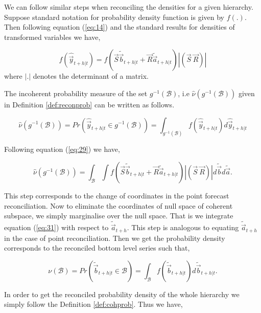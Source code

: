 \documentclass[graybox]{svmult}
\begin{document}
We can follow similar steps when reconciling the densities for a given hierarchy. 
Suppose standard notation for probability density function is given by $f(.)$.  Then following equation (\ref{eq:14}) and the standard results for densities of transformed variables we have, 

\begin{equation}\label{eq:29}
f(\hat{\vec{y}}_{t+h|t})=f(\vec{S}\tilde{\vec{b}}_{t+h|t}+\vec{R}\tilde{\vec{a}}_{t+h|t})|(\vec{S}~\vec{R})|
\end{equation}
where $|.|$ denotes the determinant of a matrix.  

The incoherent probability measure of the set $g^{-1}(\mathcal{B})$, i.e $\hat{\nu}(g^{-1}(\mathcal{B}))$ given in Definition \ref{def:reconprob} can be written as follows.

\begin{equation}\label{eq:30}
\hat{\nu}(g^{-1}(\mathcal{B})) = Pr(\hat{\vec{y}}_{t+h|t} \in g^{-1}(\mathcal{B}))
= \int_{g^{-1}(\mathcal{B})}f(\hat{\vec{y}}_{t+h|t})d\hat{\vec{y}}_{t+h|t}
\end{equation}

Following equation (\ref{eq:29}) we have, 

\begin{equation}\label{eq:31}
\hat{\nu}(g^{-1}(\mathcal{B})) = \int_{\mathcal{B}}\int f(\vec{S}\tilde{\vec{b}}_{t+h|t}+\vec{R}\tilde{\vec{a}}_{t+h|t})|(\vec{S}~\vec{R})|d\tilde{\vec{b}}d\tilde{\vec{a}}.
\end{equation}

This step corresponds to the change of coordinates in the point forecast reconciliation. Now to eliminate the coordinates of null space of coherent subspace, we simply marginalise over the null space. That is we integrate equation (\ref{eq:31}) with respect to $\tilde{\vec{a}}_{t+h}$. This step is analogous to equating $\tilde{\vec{a}}_{t+h}$ in the case of point reconciliation. Then we get the probability density corresponds to the reconciled bottom level series such that, 

\begin{equation}\label{eq:32}
\nu(\mathcal{B}) = Pr(\tilde{\vec{b}}_{t+h|t} \in \mathcal{B})
= \int_{\mathcal{B}}f(\tilde{\vec{b}}_{t+h|t})d\tilde{\vec{b}}_{t+h|t}.
\end{equation}  

In order to get the reconciled probability density of the whole hierarchy we simply follow the Definition \ref{def:cohprob}. Thus we have, 
\end{document}
